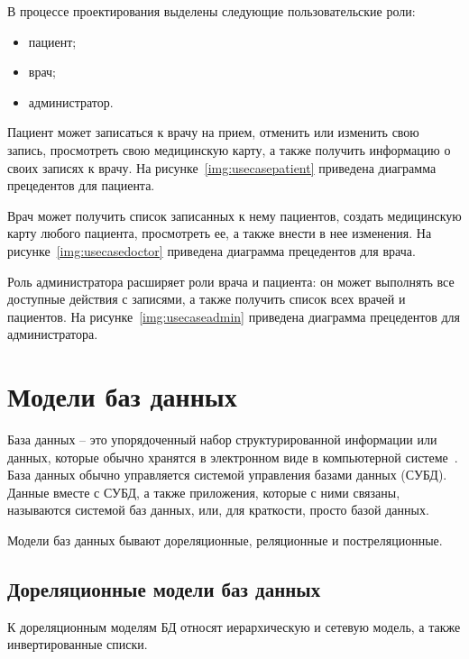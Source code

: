 В процессе проектирования выделены следующие пользовательские роли: 
\begin{itemize}
	\item пациент;
	\item врач;
	\item администратор.
\end{itemize}

Пациент может записаться к врачу на прием, отменить или изменить свою запись, просмотреть свою медицинскую карту, а также получить информацию о своих записях к врачу.
На рисунке~\ref{img:usecasepatient} приведена диаграмма прецедентов для пациента.

Врач может получить список записанных к нему пациентов, создать медицинскую карту любого пациента, просмотреть ее, а также внести в нее изменения.
На рисунке~\ref{img:usecasedoctor} приведена диаграмма прецедентов для врача.

\newpage
Роль администратора расширяет роли врача и пациента: он может выполнять все доступные действия с записями, а также получить список всех врачей и пациентов.
На рисунке~\ref{img:usecaseadmin} приведена диаграмма прецедентов для администратора.


\clearpage
\section{Модели баз данных}

База данных -- это упорядоченный набор структурированной информации или данных, которые обычно хранятся в электронном виде в компьютерной системе~\cite{db_opr}.
База данных обычно управляется системой управления базами данных (СУБД). 
Данные вместе с СУБД, а также приложения, которые с ними связаны, называются системой баз данных, или, для краткости, просто базой данных. 

Модели баз данных бывают дореляционные, реляционные и постреляционные.

\subsection{Дореляционные модели баз данных}

К дореляционным моделям БД относят иерархическую и сетевую модель, а также инвертированные списки.

